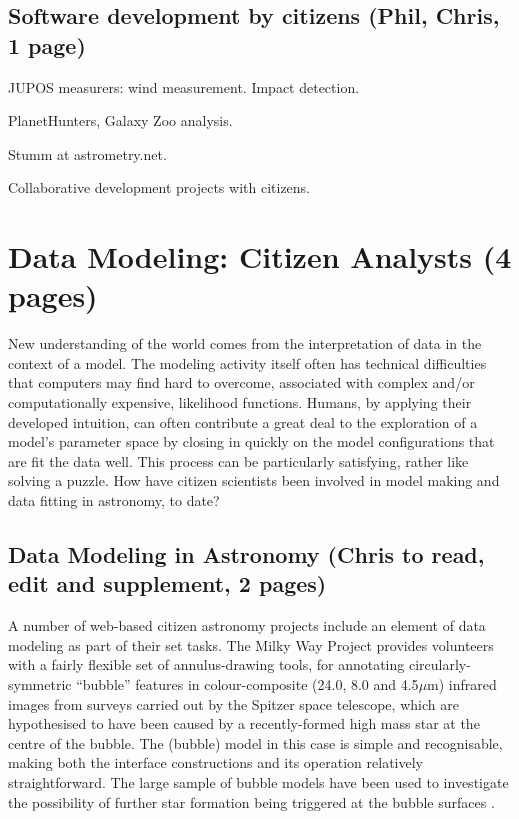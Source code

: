 \documentclass{ar2e}
\begin{document}


\subsection{Software development by citizens (\textbf{Phil}, Chris, 1 page)}
\label{sec:instr:software}

JUPOS measurers: wind measurement. 
Impact detection.

PlanetHunters, Galaxy Zoo analysis.

Stumm at astrometry.net.  

Collaborative development projects with citizens. 




\section{Data Modeling: Citizen Analysts (4 pages)}
\label{sec:model}

New understanding of the world comes from the interpretation of data in the
context of a model. The modeling activity itself often has technical
difficulties that computers may find hard to overcome, associated with complex
and/or computationally expensive, likelihood functions. Humans, by applying
their developed intuition, can often contribute a great deal to the
exploration of a model's parameter space by closing in quickly on the model
configurations that are fit the data well. This process can be particularly
satisfying, rather like solving a puzzle. How have citizen scientists been
involved in model making and data fitting in astronomy, to date?



\subsection{Data Modeling in Astronomy (Chris to read, edit and supplement, 2 pages)}
\label{sec:model:astro}

A number of  web-based citizen astronomy projects include an element of data
modeling as part of their set tasks. The Milky Way Project
\citep{SimpsonEtal2012} provides volunteers with a fairly flexible set of
annulus-drawing tools, for annotating circularly-symmetric ``bubble'' features
in colour-composite (24.0, 8.0 and  4.5$\mu$m) infrared images from surveys
carried out by the Spitzer space telescope, which are hypothesised to have
been caused by a recently-formed high mass star at the centre of the bubble.
The (bubble) model in this case is simple and recognisable, making both the
interface constructions and its operation relatively straightforward. The
large sample of  bubble models have been used to investigate the possibility
of further star formation being triggered at the bubble surfaces
\citep{KendrewEtal2012}.
\end{document}
